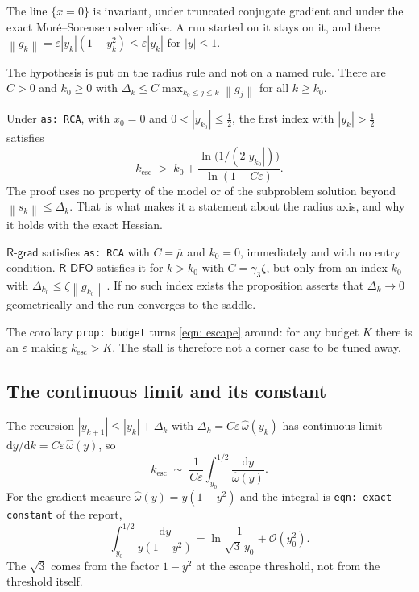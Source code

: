 \documentclass[11pt,a4paper]{article}
\providecommand{\calO}{{\mathcal{O}}}
\providecommand{\abs}[1]{\left \vert #1 \right \vert}
\providecommand{\norm}[1]{\left \lVert #1 \right \rVert}
\providecommand{\Rdfo}{\textsf{R-DFO}}
\providecommand{\Rgrad}{\textsf{R-grad}}
\providecommand{\gthree}{\gamma_3}
\theoremstyle{definition}
\theoremstyle{remark}
\begin{document}
\begin{description}[leftmargin=2.6em, style=nextline]
  \item[\texttt{prop: invariant}]
    The line $\{x = 0\}$ is invariant, under truncated conjugate gradient and
    under the exact Mor\'e--Sorensen solver alike. A run started on it stays on
    it, and there $\norm{g_k} = \varepsilon\abs{y_k}(1-y_k^2) \leq
    \varepsilon\abs{y_k}$ for $\abs{y} \leq 1$.
  \item[\texttt{as: RCA}]
    The hypothesis is put on the radius rule and not on a named rule. There are
    $C > 0$ and $k_0 \geq 0$ with
    $\Delta_k \leq C \max_{k_0 \leq j \leq k}\norm{g_j}$ for all $k \geq k_0$.
  \item[\texttt{prop: escape}]
    Under \texttt{as: RCA}, with $x_0 = 0$ and $0 < \abs{y_{k_0}} \leq \tfrac12$,
    the first index with $\abs{y_k} > \tfrac12$ satisfies
    \begin{equation}
      k_{\mathrm{esc}} \;>\; k_0
        + \frac{\ln\bigl(1/(2\abs{y_{k_0}})\bigr)}{\ln(1 + C\varepsilon)}.
      \label{eqn: escape}
    \end{equation}
    The proof uses no property of the model or of the subproblem solution beyond
    $\norm{s_k} \leq \Delta_k$. That is what makes it a statement about the
    radius axis, and why it holds with the exact Hessian.
  \item[\texttt{prop: rdfo}]
    $\Rgrad$ satisfies \texttt{as: RCA} with $C = \overline{\mu}$ and $k_0 = 0$,
    immediately and with no entry condition. $\Rdfo$ satisfies it for $k > k_0$
    with $C = \gthree\zeta$, but only from an index $k_0$ with
    $\Delta_{k_0} \leq \zeta\norm{g_{k_0}}$. If no such index exists the
    proposition asserts that $\Delta_k \to 0$ geometrically and the run converges
    to the saddle.
\end{description}

The corollary \texttt{prop: budget} turns \eqref{eqn: escape} around: for any
budget $K$ there is an $\varepsilon$ making $k_{\mathrm{esc}} > K$. The stall is
therefore not a corner case to be tuned away.

\subsection{The continuous limit and its constant}

The recursion $\abs{y_{k+1}} \leq \abs{y_k} + \Delta_k$ with
$\Delta_k = C\varepsilon\,\hat\omega(y_k)$ has continuous limit
$\mathrm{d}y/\mathrm{d}k = C\varepsilon\,\hat\omega(y)$, so
\begin{equation}
  k_{\mathrm{esc}} \;\sim\;
    \frac{1}{C\varepsilon}\int_{y_0}^{1/2}\frac{\mathrm{d}y}{\hat\omega(y)} .
  \label{eqn: continuous limit}
\end{equation}
For the gradient measure $\hat\omega(y) = y(1-y^2)$ and the integral is
\texttt{eqn: exact constant} of the report,
\begin{equation}
  \int_{y_0}^{1/2}\frac{\mathrm{d}y}{y(1-y^2)}
    = \ln\frac{1}{\sqrt3\,y_0} + \calO(y_0^2).
  \label{eqn: exact constant}
\end{equation}
The $\sqrt3$ comes from the factor $1-y^2$ at the escape threshold, not from the
threshold itself.
\end{document}
